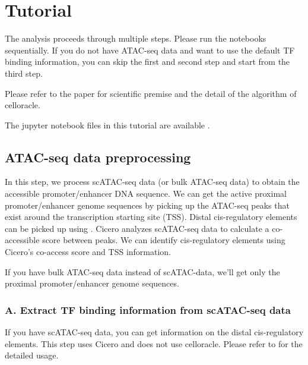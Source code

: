 \documentclass[letterpaper,10pt,english]{sphinxmanual}
\begin{document}
\section{Tutorial}
\label{\detokenize{tutorials/index:tutorial}}\label{\detokenize{tutorials/index:id1}}\label{\detokenize{tutorials/index::doc}}
The analysis proceeds through multiple steps.
Please run the notebooks sequentially.
If you do not have ATAC-seq data and want to use the default TF binding information, you can skip the first and second step and start from the third step.

Please refer to the  paper for scientific premise and the detail of the algorithm of celloracle.

The jupyter notebook files in this tutorial are available  .


\subsection{ATAC-seq data preprocessing}
\label{\detokenize{tutorials/atac:atac-seq-data-preprocessing}}\label{\detokenize{tutorials/atac:atac}}\label{\detokenize{tutorials/atac::doc}}
In this step, we process scATAC-seq data (or bulk ATAC-seq data) to obtain the accessible promoter/enhancer DNA sequence.
We can get the active proximal promoter/enhancer genome sequences by picking up the ATAC-seq peaks that exist around the transcription starting site (TSS).
Distal cis-regulatory elements can be picked up using   .
Cicero analyzes scATAC-seq data to calculate a co-accessible score between peaks.
We can identify cis-regulatory elements using Cicero’s co-access score and TSS information.

If you have bulk ATAC-seq data instead of scATAC-data, we’ll get only the proximal promoter/enhancer genome sequences.


\subsubsection{A. Extract TF binding information from scATAC-seq data}
\label{\detokenize{tutorials/atac:a-extract-tf-binding-information-from-scatac-seq-data}}
If you have scATAC-seq data, you can get information on the distal cis-regulatory elements.
This step uses Cicero and does not use celloracle. Please refer to  for the detailed usage.
\end{document}
